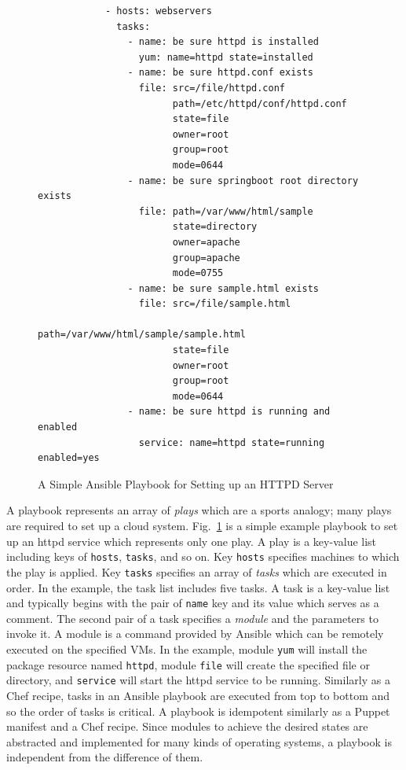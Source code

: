 \documentclass[12pt]{report}
\begin{document}
\begin{figure}
\small
\begin{verbatim}
            - hosts: webservers
              tasks:
                - name: be sure httpd is installed
                  yum: name=httpd state=installed
                - name: be sure httpd.conf exists
                  file: src=/file/httpd.conf
                        path=/etc/httpd/conf/httpd.conf
                        state=file
                        owner=root
                        group=root
                        mode=0644
                - name: be sure springboot root directory exists
                  file: path=/var/www/html/sample
                        state=directory
                        owner=apache
                        group=apache
                        mode=0755
                - name: be sure sample.html exists
                  file: src=/file/sample.html
                        path=/var/www/html/sample/sample.html
                        state=file
                        owner=root
                        group=root
                        mode=0644
                - name: be sure httpd is running and enabled
                  service: name=httpd state=running enabled=yes
\end{verbatim}
\normalsize
\vspace{-0.6cm}
\caption{A Simple Ansible Playbook for Setting up an HTTPD Server}
\label{fig:AnsibleExample}
\end{figure}

\noindent
A playbook represents an array of {\it plays} which are a sports
analogy; many plays are required to set up a cloud
system. Fig.~\ref{fig:AnsibleExample} is a simple example playbook to
set up an httpd service which represents only one play. A play is a
key-value list including keys of {\tt hosts}, {\tt tasks}, and so
on. Key {\tt hosts} specifies machines to which the play is applied.
Key {\tt tasks} specifies an array of {\it tasks} which are executed
in order.  In the example, the task list includes five tasks. A task
is a key-value list and typically begins with the pair of {\tt name}
key and its value which serves as a comment. The second pair of a task
specifies a {\it module} and the parameters to invoke it.  A module is
a command provided by Ansible which can be remotely executed on the
specified VMs. In the example, module {\tt yum} will install the
package resource named {\tt httpd}, module {\tt file} will create the
specified file or directory, and {\tt service} will start the httpd
service to be running. Similarly as a Chef recipe, tasks in an Ansible
playbook are executed from top to bottom and so the order of tasks is
critical.  A playbook is idempotent similarly as a Puppet manifest and
a Chef recipe. Since modules to achieve the desired states are
abstracted and implemented for many kinds of operating systems, a
playbook is independent from the difference of them.
\end{document}
